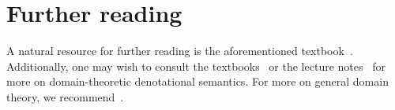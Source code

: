 \section{Further reading}

A natural resource for further reading is the aforementioned
textbook~\cite{Streicher2006}.
%
Additionally, one may wish to consult the
textbooks~\cite{Winskel1993,Gunther1992} or the lecture
notes~\cite{Plotkin1983,PittsWinskelFiore2012} for more on domain-theoretic denotational
semantics.
%
For more on general domain theory, we
recommend~\cite{AbramskyJung1994,GierzEtAl2003}.


